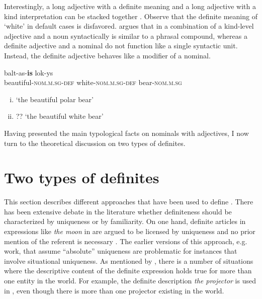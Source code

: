 \documentclass[output=paper,
modfonts
]{langscibook}
\begin{document}
Interestingly, a long adjective with a definite meaning and a long adjective with a kind interpretation can be stacked together . Observe that the definite meaning of `white' in default cases is disfavored. \citet{Sereikaite2017} argues that in  a combination of a kind-level adjective and a noun syntactically is similar to a phrasal compound, whereas a definite adjective and a nominal do not function like a single syntactic unit. Instead, the definite adjective behaves like a modifier of a nominal. 

\begin{exe}
\ex \label{ex:sereikaite:12}
 {balt-as-\textbf{is}} {lok-ys} \\
beautiful-\textsc{nom.m.sg}-{\textsc{def}} white-\textsc{nom.m.sg}-{\textsc{def}} bear-\textsc{nom.m.sg} \\
\trans 
\begin{enumerate}[(i)]
	\item `the beautiful polar bear'\\
	\item ?? `the beautiful white bear' 
\end{enumerate}
\end{exe}



Having presented the main typological facts on nominals with adjectives, I now turn to the theoretical discussion on two types of definites.


\section{Two types of definites} \label{sec:sereikaite:3}

This section describes different approaches that have been used to define . There has been extensive debate in the literature whether definiteness should be characterized by uniqueness or by familiarity. On one hand, definite articles in expressions like \textit{the moon} in  are argued to be licensed by uniqueness and no prior mention of the referent is necessary \citep{Russell1905,Strawson1950,Frege1892}. The earlier versions of this approach, e.g.  work, that assume ``absolute'' uniqueness are problematic for instances that involve situational uniqueness. As mentioned by \citet{Schwarz2013}, there is a number of situations where the descriptive content of the definite expression holds true for more than one entity in the world. For example, the definite description \textit{the projector} is used in , even though there is more than one projector existing in the world. 
\end{document}
